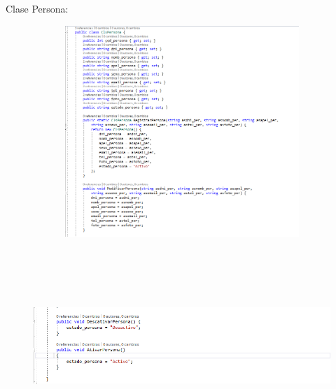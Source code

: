 \documentclass[12pt]{article}
\begin{document}
\begin{enumerate}[label*=\arabic*.]
\begin{enumerate}[label*=\arabic*.]
\newpage
Clase Persona:
\begin{figure}[H]
	\begin{Center}
		\includegraphics[width=4.91in,height=3.15in]{./media/9a.png}
	\end{Center}
	\begin{Center}
		\includegraphics[width=4.91in,height=3.15in]{./media/9b.png}
	\end{Center}
\end{figure}


\end{enumerate}
\end{enumerate}
\end{document}
